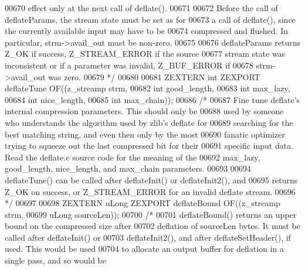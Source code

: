\begin{DoxyCode}
00670 \textcolor{comment}{   effect only at the next call of deflate().}
00671 \textcolor{comment}{}
00672 \textcolor{comment}{     Before the call of deflateParams, the stream state must be set as for}
00673 \textcolor{comment}{   a call of deflate(), since the currently available input may have to be}
00674 \textcolor{comment}{   compressed and flushed.  In particular, strm->avail\_out must be non-zero.}
00675 \textcolor{comment}{}
00676 \textcolor{comment}{     deflateParams returns Z\_OK if success, Z\_STREAM\_ERROR if the source}
00677 \textcolor{comment}{   stream state was inconsistent or if a parameter was invalid, Z\_BUF\_ERROR if}
00678 \textcolor{comment}{   strm->avail\_out was zero.}
00679 \textcolor{comment}{*/}
00680 
00681 ZEXTERN \textcolor{keywordtype}{int} ZEXPORT deflateTune OF((z\_streamp strm,
00682                                     \textcolor{keywordtype}{int} good\_length,
00683                                     \textcolor{keywordtype}{int} max\_lazy,
00684                                     \textcolor{keywordtype}{int} nice\_length,
00685                                     \textcolor{keywordtype}{int} max\_chain));
00686 \textcolor{comment}{/*}
00687 \textcolor{comment}{     Fine tune deflate's internal compression parameters.  This should only be}
00688 \textcolor{comment}{   used by someone who understands the algorithm used by zlib's deflate for}
00689 \textcolor{comment}{   searching for the best matching string, and even then only by the most}
00690 \textcolor{comment}{   fanatic optimizer trying to squeeze out the last compressed bit for their}
00691 \textcolor{comment}{   specific input data.  Read the deflate.c source code for the meaning of the}
00692 \textcolor{comment}{   max\_lazy, good\_length, nice\_length, and max\_chain parameters.}
00693 \textcolor{comment}{}
00694 \textcolor{comment}{     deflateTune() can be called after deflateInit() or deflateInit2(), and}
00695 \textcolor{comment}{   returns Z\_OK on success, or Z\_STREAM\_ERROR for an invalid deflate stream.}
00696 \textcolor{comment}{ */}
00697 
00698 ZEXTERN uLong ZEXPORT deflateBound OF((z\_streamp strm,
00699                                        uLong sourceLen));
00700 \textcolor{comment}{/*}
00701 \textcolor{comment}{     deflateBound() returns an upper bound on the compressed size after}
00702 \textcolor{comment}{   deflation of sourceLen bytes.  It must be called after deflateInit() or}
00703 \textcolor{comment}{   deflateInit2(), and after deflateSetHeader(), if used.  This would be used}
00704 \textcolor{comment}{   to allocate an output buffer for deflation in a single pass, and so would be}

\end{DoxyCode}
